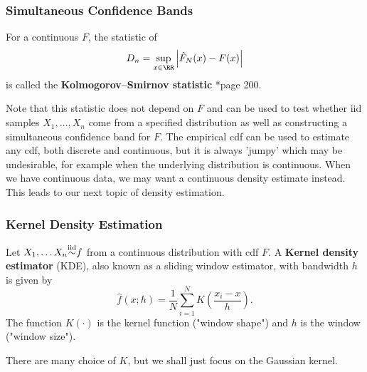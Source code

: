 \subsubsection*{Simultaneous Confidence Bands}


\begin{defe} \label{defe: TBD}
    For a continuous $F$, the statistic of
    \begin{equation*}
        D_n = \sup_{x \in \RR} \left| \hat{F}_N (x) - F(x) \right|
    \end{equation*}
    is called the {\bf Kolmogorov–Smirnov statistic} \cite{KroeseDirkP2013SMaC}*{page 200}.
\end{defe}

Note that this statistic does not depend on $F$ and can be used to test whether iid samples $X_1 , \ldots , X_n$ come from a specified distribution as well as constructing a simultaneous confidence band for $F$. The empirical cdf can be used to estimate any cdf, both discrete and continuous, but it is always 'jumpy' which may be undesirable, for example when the underlying distribution is continuous. When we have continuous data, we may want a continuous density estimate instead. This leads to our next topic of density estimation.

\subsubsection*{Kernel Density Estimation}

\begin{defe} \label{defe: KDE}
    Let $X_1 , \ldots X_n {\overset{\text{iid}}{\sim}} f$ from a continuous distribution with cdf $F$. A {\bf Kernel density estimator} (KDE), also known as a sliding window estimator, with bandwidth $h$ is given by
    \begin{equation*}
        \hat{f} (x;h) = \frac{1}{N} \sum_{i=1}^{N} K \left( \frac{x_i - x}{h} \right).
    \end{equation*}
    The function $K (\cdot)$ is the kernel function ("window shape") and $h$ is the window ("window size").
\end{defe}

There are many choice of $K$, but we shall just focus on the Gaussian kernel.

